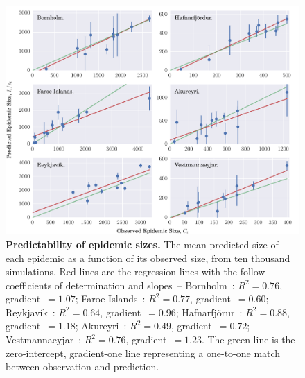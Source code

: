\documentclass[10pt]{article}
\begin{document}
\begin{figure}[!h]
\centering
\includegraphics[width=\textwidth]{figures/q3.pdf}
\caption{\textbf{Predictability of epidemic sizes.} The mean predicted size of each epidemic as a function of its observed size, from ten thousand simulations. Red lines are the regression lines with the follow coefficients of determination and slopes~-- Bornholm~: $R^2=0.76$, gradient~$=1.07$; Faroe Islands~: $R^2=0.77$, gradient~$=0.60$; Reykjav\'{i}k~: $R^2=0.64$, gradient~$=0.96$; Hafnarfj\"{o}r\dh{}ur~: $R^2=0.88$, gradient~$=1.18$; Akureyri~: $R^2 = 0.49$, gradient~$=0.72$; Vestmannaeyjar~: $R^2=0.76$, gradient~$=1.23$. The green line is the zero-intercept, gradient-one line representing a one-to-one match between observation and prediction.}
\label{fig_sizes}
\end{figure}
\end{document}
